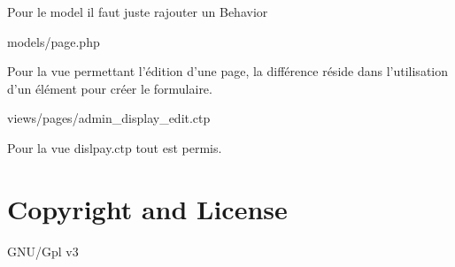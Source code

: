 \par
\-Pour le model il faut juste rajouter un \-Behavior \par
 \par
 models/page.\-php 
 \par
\-Pour la vue permettant l'édition d'une page, la différence réside dans l'utilisation d'un élément pour créer le formulaire. \par
\par
 views/pages/admin\-\_\-display\-\_\-edit.\-ctp 
 \par
\par
\-Pour la vue dislpay.\-ctp tout est permis.\hypertarget{index_copyright}{}\section{\-Copyright and License}\label{index_copyright}
\-G\-N\-U/\-Gpl v3

\par
\par
 